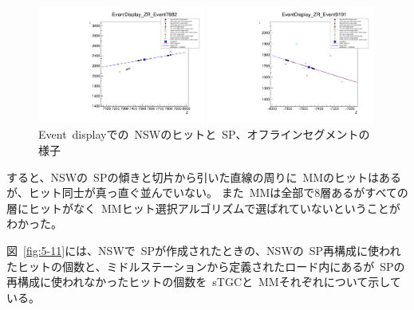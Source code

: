 \begin{figure}[H]
  \begin{minipage}[b]{0.45\linewidth}
      \centering
      \includegraphics[clip, width=5.5cm]{fig/5/EventDisplay_7882_ZR_withMM.pdf}
  \end{minipage}
    \begin{minipage}[b]{0.45\linewidth}
      \centering
      \includegraphics[clip, width=5.5cm]{fig/5/EventDisplay_9191_ZR_withMM.pdf}
  \end{minipage}
  \caption{Event~displayでの~NSWのヒットと~SP、オフラインセグメントの様子}\label{fig:5-10}
\end{figure}

すると、NSWの~SPの傾きと切片から引いた直線の周りに~MMのヒットはあるが、ヒット同士が真っ直ぐ並んでいない。
また~MMは全部で8層あるがすべての層にヒットがなく~MMヒット選択アルゴリズムで選ばれていないということがわかった。


図~\ref{fig:5-11}には、NSWで~SPが作成されたときの、NSWの~SP再構成に使われたヒットの個数と、ミドルステーションから定義されたロード内にあるが~SPの再構成に使われなかったヒットの個数を~sTGCと~MMそれぞれについて示している。

